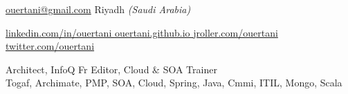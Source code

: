 \documentclass[10pt,a4paper]{article}
\begin{document}
\sloppy  %



\thispagestyle{empty} %

\nobreakvspace{0.3em}  %

\href{mailto:ouertani.at.gmail.dot.com}{ouertani\mbox{}@\mbox{}gmail.com}\sbull
{} \sbull
{ Riyadh} \emph{(Saudi Arabia)}

\href{http://linkedin.com/in/ouertani }{linkedin.com/in/ouertani }\sbull
\href{http://ouertani.github.io }{ouertani.github.io }\sbull
\href{http://jroller.com/ouertani }{jroller.com/ouertani }\sbull
\href{http://twitter.com/ouertani }{twitter.com/ouertani }


\begin{center}
      \Large Architect, InfoQ Fr Editor, Cloud \& SOA Trainer \\
      \large Togaf, Archimate, PMP, SOA, Cloud, Spring, Java, Cmmi, ITIL, Mongo, Scala
 \end{center}


\spacedhrule{0.9em}{-0.4em}  %

\end{document}
